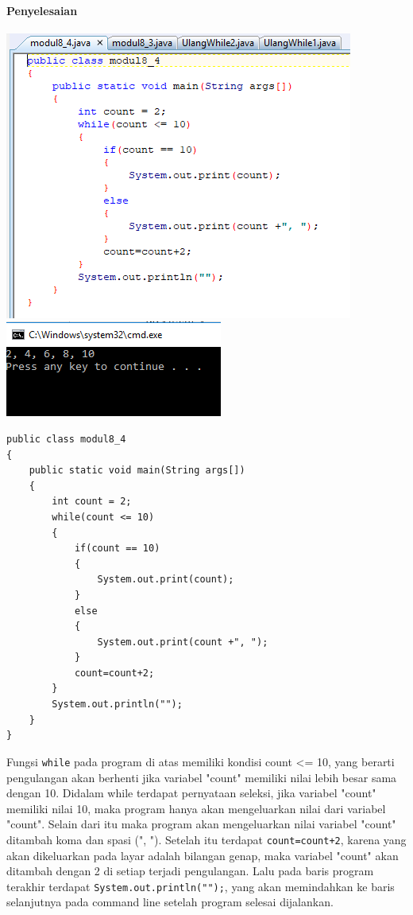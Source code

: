 \documentclass[a4paper,12pt]{article}
\begin{document}
\paragraph{Penyelesaian\\}
	\includegraphics[scale=.7]{Capture8}
	\includegraphics[scale=1]{Capture9}

\begin{lstlisting}[frame=single]
public class modul8_4
{
    public static void main(String args[])
    {
        int count = 2;
        while(count <= 10)
        {
            if(count == 10)
            {
                System.out.print(count);
            }
            else
            {
                System.out.print(count +", ");
            }
            count=count+2;
        }
        System.out.println("");
    }
}
\end{lstlisting}
Fungsi \texttt{while} pada program di atas memiliki kondisi count <= 10, yang berarti pengulangan akan berhenti jika variabel "count" memiliki nilai lebih besar sama dengan 10. Didalam while terdapat pernyataan seleksi, jika variabel "count" memiliki nilai 10, maka program hanya akan mengeluarkan nilai dari variabel "count". Selain dari itu maka program akan mengeluarkan nilai variabel "count" ditambah koma dan spasi (", "). Setelah itu terdapat \texttt{count=count+2}, karena yang akan dikeluarkan pada layar adalah bilangan genap, maka variabel "count" akan ditambah dengan  2 di setiap terjadi pengulangan. Lalu pada baris program terakhir terdapat \texttt{System.out.println("");}, yang akan memindahkan ke baris selanjutnya pada command line setelah program selesai dijalankan.
\end{document}
